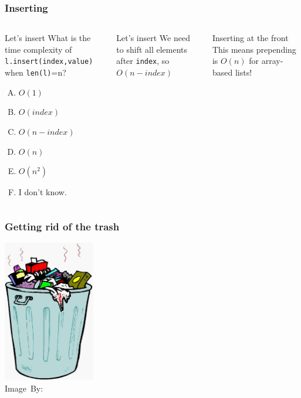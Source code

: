 \begin{frame}
	\frametitle{Inserting}
	\begin{columns}

		\begin{questionblock}{Let's insert}
			What is the time complexity of \texttt{l.insert(index,value)} when \texttt{len(l)}=n?
			\begin{enumerate}[A.]
				\item $O(1)$
				\item $O(\textit{index})$
				\item $O(n - \textit{index})$
				\item $O(n)$
				\item $O(n^2)$
				\item I don't know.
			\end{enumerate}
		\end{questionblock}
		\pause
		\begin{answerblock}{Let's insert}
			We need to shift all elements after \texttt{index}, so $O(n-\textit{index})$
		\end{answerblock}
		\pause
		\begin{alertblock}{Inserting at the front}
			This means prepending is $O(n)$ for array-based lists!
		\end{alertblock}	
	\end{columns}
\end{frame}

\begin{frame}
	\frametitle{Getting rid of the trash}
	\begin{center}
		\includegraphics[width=0.3\textwidth]{figures/trash.jpg}\\
		\hspace*{15pt}\hbox{\scriptsize Image By:}
	\end{center}
\end{frame}

